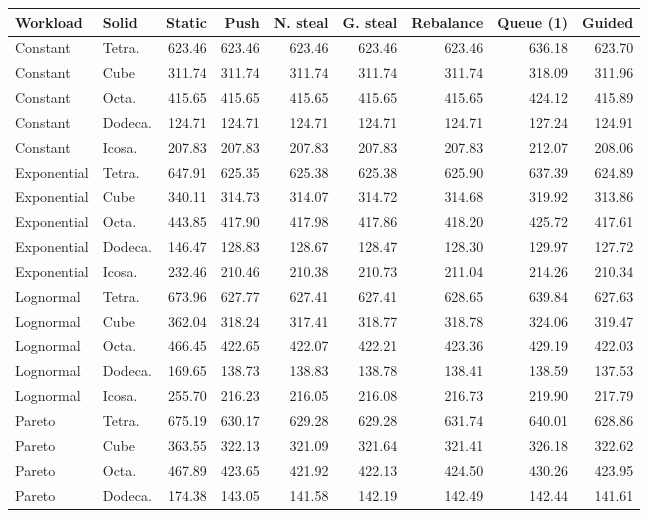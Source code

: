 \begin{tabular}{llrrrrrrr}
\toprule
Workload & Solid & Static & Push & N. steal & G. steal & Rebalance & Queue (1) & Guided \\
\midrule
Constant & Tetra. & 623.46 & 623.46 & 623.46 & 623.46 & 623.46 & 636.18 & 623.70 \\
Constant & Cube & 311.74 & 311.74 & 311.74 & 311.74 & 311.74 & 318.09 & 311.96 \\
Constant & Octa. & 415.65 & 415.65 & 415.65 & 415.65 & 415.65 & 424.12 & 415.89 \\
Constant & Dodeca. & 124.71 & 124.71 & 124.71 & 124.71 & 124.71 & 127.24 & 124.91 \\
Constant & Icosa. & 207.83 & 207.83 & 207.83 & 207.83 & 207.83 & 212.07 & 208.06 \\
\midrule
Exponential & Tetra. & 647.91 & 625.35 & 625.38 & 625.38 & 625.90 & 637.39 & 624.89 \\
Exponential & Cube & 340.11 & 314.73 & 314.07 & 314.72 & 314.68 & 319.92 & 313.86 \\
Exponential & Octa. & 443.85 & 417.90 & 417.98 & 417.86 & 418.20 & 425.72 & 417.61 \\
Exponential & Dodeca. & 146.47 & 128.83 & 128.67 & 128.47 & 128.30 & 129.97 & 127.72 \\
Exponential & Icosa. & 232.46 & 210.46 & 210.38 & 210.73 & 211.04 & 214.26 & 210.34 \\
\midrule
Lognormal & Tetra. & 673.96 & 627.77 & 627.41 & 627.41 & 628.65 & 639.84 & 627.63 \\
Lognormal & Cube & 362.04 & 318.24 & 317.41 & 318.77 & 318.78 & 324.06 & 319.47 \\
Lognormal & Octa. & 466.45 & 422.65 & 422.07 & 422.21 & 423.36 & 429.19 & 422.03 \\
Lognormal & Dodeca. & 169.65 & 138.73 & 138.83 & 138.78 & 138.41 & 138.59 & 137.53 \\
Lognormal & Icosa. & 255.70 & 216.23 & 216.05 & 216.08 & 216.73 & 219.90 & 217.79 \\
\midrule
Pareto & Tetra. & 675.19 & 630.17 & 629.28 & 629.28 & 631.74 & 640.01 & 628.86 \\
Pareto & Cube & 363.55 & 322.13 & 321.09 & 321.64 & 321.41 & 326.18 & 322.62 \\
Pareto & Octa. & 467.89 & 423.65 & 421.92 & 422.13 & 424.50 & 430.26 & 423.95 \\
Pareto & Dodeca. & 174.38 & 143.05 & 141.58 & 142.19 & 142.49 & 142.44 & 141.61 \\

\end{tabular}
